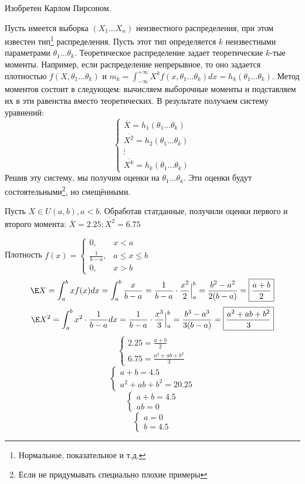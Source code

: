 Изобретен Карлом Пирсоном.

Пусть имеется выборка \((X_1 \dots X_n)\) неизвестного распределения, при этом известен тип\footnote{Нормальное, показательное и т.д.} распределения. Пусть этот тип определяется \(k\) неизвестными параметрами \(\theta_1 \dots \theta_k\). Теоретическое распределение задает теоретические \(k\)-тые моменты. Например, если распределение непрерывное, то оно задается плотностью \(f(X, \theta_1 \dots \theta_k)\) и \(m_k = \int_{ - \infty}^{ +\infty} X^k f(x, \theta_1 \dots \theta_k) dx = h_k(\theta_1 \dots \theta_k)\). Метод моментов состоит в следующем: вычисляем выборочные моменты и подставляем их в эти равенства вместо теоретических. В результате получаем систему уравнений:
\[\begin{cases}
        \overline{X} = h_1(\theta_1 \dots \theta_k)   \\
        \overline{X^2} = h_2(\theta_1 \dots \theta_k) \\
        \vdots                                        \\
        \overline{X^k} = h_k(\theta_1 \dots \theta_k)
    \end{cases}\]
Решив эту систему, мы получим оценки на \(\theta_1 \dots \theta_k\). Эти оценки будут состоятельными\footnote{Если не придумывать специально плохие примеры}, но смещёнными.

\begin{example}
    Пусть \(X \in U(a, b), a < b\). Обработав статданные, получили оценки первого и второго момента: \(\overline{X} = 2.25; \overline{X^2} = 6.75\)
\end{example}
\begin{solution}
    Плотность \(f(x) = \begin{cases}
        0,               & x < a           \\
        \frac{1}{b - a}, & a \leq x \leq b \\
        0,               & x > b
    \end{cases}\)
    \[\E X = \int_a^b x f(x) dx = \int_a^b \frac{x}{b - a} = \frac{1}{b - a} \cdot \frac{x^2}{2}\Big|_a^b = \frac{b^2 - a^2}{2(b - a)} = \boxed{\frac{a + b}{2}}\]
    \[\E X^2 = \int_a^b x^2 \cdot \frac{1}{b - a} dx = \frac{1}{b - a} \cdot \frac{x^3}{3} \Big|_a^b = \frac{b^3 - a^3}{3(b - a)} = \boxed{\frac{a^2 + ab + b^2}{3}}\]
    \[\begin{cases}
            2.25 = \frac{a + b}{2} \\
            6.75 = \frac{a^2 + ab + b^2}{3}
        \end{cases}\]
    \[\begin{cases}
            a + b = 4.5 \\
            a^2 + ab + b^2 = 20.25
        \end{cases}\]
    \[\begin{cases}
            a + b = 4.5 \\
            ab = 0
        \end{cases}\]
    \[\begin{cases}
            a = 0 \\
            b = 4.5
        \end{cases}\]
\end{solution}
